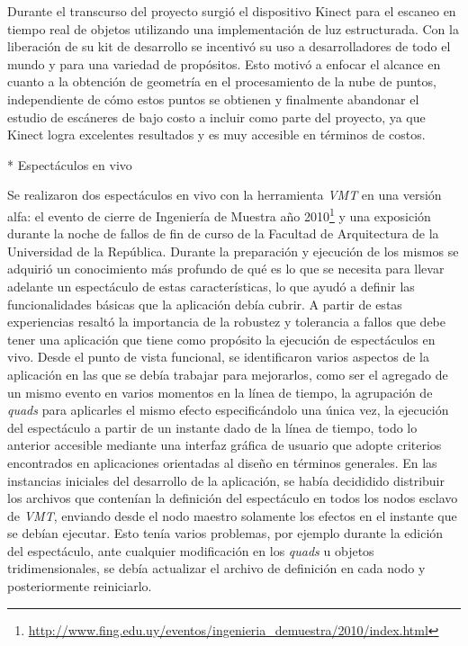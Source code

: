 Durante el transcurso del proyecto surgió el dispositivo Kinect para el escaneo en tiempo real de objetos utilizando una implementación de luz estructurada. Con la liberación de su kit de desarrollo se incentivó su uso a desarrolladores de todo el mundo y para una variedad de propósitos. Esto motivó a enfocar el alcance en cuanto a la obtención de geometría en el procesamiento de la nube de puntos, independiente de cómo estos puntos se obtienen y finalmente abandonar el estudio de escáneres de bajo costo a incluir como parte del proyecto, ya que Kinect logra excelentes resultados y es muy accesible en términos de costos.

* Espectáculos en vivo

Se realizaron dos espectáculos en vivo con la herramienta \emph{VMT} en una versión alfa: el evento de cierre de Ingeniería de Muestra año 2010\footnote{\url{http://www.fing.edu.uy/eventos/ingenieria_demuestra/2010/index.html}} y una exposición durante la noche de fallos de fin de curso de la Facultad de Arquitectura de la Universidad de la República. Durante la preparación y ejecución de los mismos se adquirió un conocimiento más profundo de qué es lo que se necesita para llevar adelante un espectáculo de estas características, lo que ayudó a definir las funcionalidades básicas que la aplicación debía cubrir. A partir de estas experiencias resaltó la importancia de la robustez y tolerancia a fallos que debe tener una aplicación que tiene como propósito la ejecución de espectáculos en vivo.
Desde el punto de vista funcional, se identificaron varios aspectos de la aplicación en las que se debía trabajar para mejorarlos, como ser el agregado de un mismo evento en varios momentos en la línea de tiempo, la agrupación de \emph{quads} para aplicarles el mismo efecto especificándolo una única vez, la ejecución del espectáculo a partir de un instante dado de la línea de tiempo, todo lo anterior accesible mediante una interfaz gráfica de usuario que adopte criterios encontrados en aplicaciones orientadas al diseño en términos generales.
En las instancias iniciales del desarrollo de la aplicación, se había decididido distribuir los archivos que contenían la definición del espectáculo en todos los nodos esclavo de \emph{VMT}, enviando desde el nodo maestro solamente los efectos en el instante que se debían ejecutar. Esto tenía varios problemas, por ejemplo durante la edición del espectáculo, ante cualquier modificación en los \emph{quads} u objetos tridimensionales, se debía actualizar el archivo de definición en cada nodo y posteriormente reiniciarlo.
